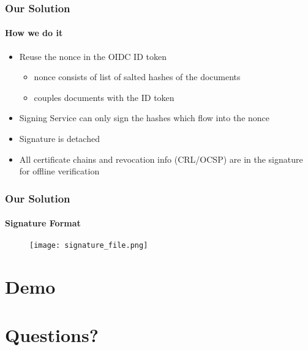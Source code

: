 \begin{frame}[t]\frametitle{Our Solution}
	\framesubtitle{How we do it}
	\begin{itemize}
		\item Reuse the nonce in the OIDC ID token
		\begin{itemize}
			\item nonce consists of list of salted hashes of the documents
			\item couples documents with the ID token
		\end{itemize}
		\item Signing Service can only sign the hashes which flow into the nonce
		\item Signature is detached
		\item All certificate chains and revocation info (CRL/OCSP) are in the signature for offline verification
	\end{itemize}
\end{frame}

\begin{frame}[t]\frametitle{Our Solution}
	\framesubtitle{Signature Format}
	\begin{figure}[ht]
		\centering
		\texttt{[image: signature\_file.png]}
	\end{figure}
\end{frame}

\section{Demo}
\sectionpage

\section{Questions?}
\sectionpage
